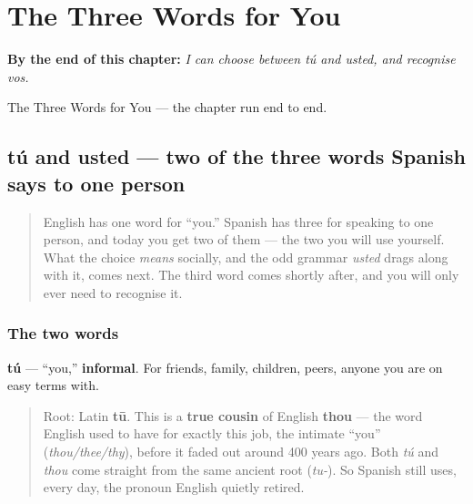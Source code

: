 
\chapter{The Three Words for You}
\label{ch:three-yous}

\begin{chapteropening}
\textbf{By the end of this chapter:} \emph{I can choose between tú and usted, and recognise vos.}

The Three Words for You — the chapter run end to end.
\end{chapteropening}

\section[tú / usted]{tú and usted — two of the three words Spanish says to one person}

\label{lesson:ES-C03-tu-usted}



\begin{quote}
English has one word for \textquotedblleft{}you.\textquotedblright{} Spanish has three for speaking to one person, and today you get two of them — the two you will use yourself. What the choice \emph{means} socially, and the odd grammar \emph{usted} drags along with it, comes next. The third word comes shortly after, and you will only ever need to recognise it.
\end{quote}

\subsection*{The two words}
\textbf{tú} — \textquotedblleft{}you,\textquotedblright{} \textbf{informal}. For friends, family, children, peers, anyone you are on easy terms with.

\begin{quote}
Root: Latin \textbf{tū}. This is a \textbf{true cousin} of English \textbf{thou} — the word English used to have for exactly this job, the intimate \textquotedblleft{}you\textquotedblright{} (\emph{thou/thee/thy}), before it faded out around 400 years ago. Both \emph{tú} and \emph{thou} come straight from the same ancient root (\emph{tu-}). So Spanish still uses, every day, the pronoun English quietly retired.
\end{quote}

